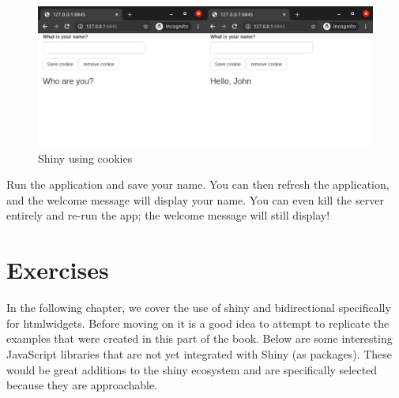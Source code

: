 \documentclass[
]{krantz}
\makeatletter
\newenvironment{Shaded}{\begin{snugshade}}{\end{snugshade}}
\newcommand{\CommentTok}[1]{\textcolor[rgb]{0.37,0.37,0.37}{\textit{#1}}}
\newcommand{\ControlFlowTok}[1]{\textcolor[rgb]{0.27,0.27,0.27}{\textbf{#1}}}
\newcommand{\KeywordTok}[1]{\textcolor[rgb]{0.27,0.27,0.27}{\textbf{#1}}}
\newcommand{\NormalTok}[1]{#1}
\newcommand{\OperatorTok}[1]{\textcolor[rgb]{0.43,0.43,0.43}{\textbf{#1}}}
\newcommand{\StringTok}[1]{\textcolor[rgb]{0.5,0.5,0.5}{#1}}
\newenvironment{kframe}{%
\medskip{}
\setlength{\fboxsep}{.8em}
 \def\at@end@of@kframe{}%
 \ifinner\ifhmode%
  \def\at@end@of@kframe{\end{minipage}}%
  \begin{minipage}{\columnwidth}%
 \fi\fi%
 \def\FrameCommand##1{\hskip\@totalleftmargin \hskip-\fboxsep
 \colorbox{shadecolor}{##1}\hskip-\fboxsep
     \hskip-\linewidth \hskip-\@totalleftmargin \hskip\columnwidth}%
 \MakeFramed {\advance\hsize-\width
   \@totalleftmargin\z@ \linewidth\hsize
   \@setminipage}}%
 {\par\unskip\endMakeFramed%
 \at@end@of@kframe}
\renewenvironment{Shaded}{\begin{kframe}}{\end{kframe}}
\makeatother
\begin{document}
\begin{Shaded}
\end{Shaded}

\begin{figure}[t]

{\centering \includegraphics[width=1\linewidth]{images/shiny-cookies-2} 

}

\caption{Shiny using cookies}\label{fig:shiny-cookies}
\end{figure}

Run the application and save your name. You can then refresh the application, and the welcome message will display your name. You can even kill the server entirely and re-run the app; the welcome message will still display!

\hypertarget{shiny-cookies-exercises}{%
\section{Exercises}\label{shiny-cookies-exercises}}

In the following chapter, we cover the use of shiny and bidirectional specifically for htmlwidgets. Before moving on it is a good idea to attempt to replicate the examples that were created in this part of the book. Below are some interesting JavaScript libraries that are not yet integrated with Shiny (as packages). These would be great additions to the shiny ecosystem and are specifically selected because they are approachable.
\end{document}
